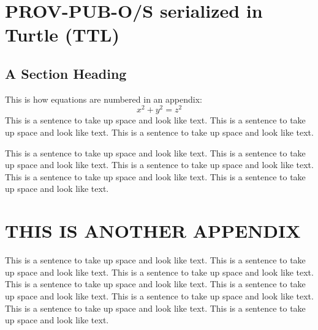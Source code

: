  
\appendix    %

\chapter{PROV-PUB-O/S serialized in Turtle (TTL)}


\section{A Section Heading}

This is how equations are numbered in an appendix:
\begin{equation}
x^2 + y^2 = z^2
\end{equation} 
This is a sentence to take up space and look like text.
This is a sentence to take up space and look like text.
This is a sentence to take up space and look like text.
 
This is a sentence to take up space and look like text.
This is a sentence to take up space and look like text.
This is a sentence to take up space and look like text.
This is a sentence to take up space and look like text.
This is a sentence to take up space and look like text. 

\chapter{THIS IS ANOTHER APPENDIX} 
This is a sentence to take up space and look like text.
This is a sentence to take up space and look like text.
This is a sentence to take up space and look like text.
This is a sentence to take up space and look like text.
This is a sentence to take up space and look like text.
This is a sentence to take up space and look like text.
This is a sentence to take up space and look like text.
This is a sentence to take up space and look like text.
 
